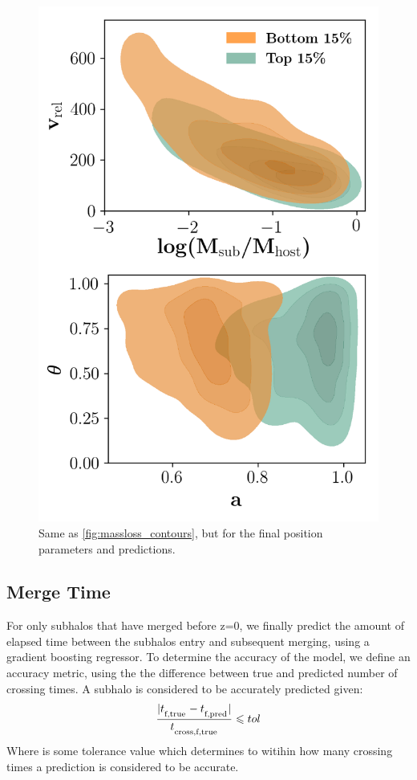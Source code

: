 \documentclass[fleqn,usenatbib]{mnras}
\begin{document}
\begin{figure}
	\includegraphics[width=\textwidth]{Figures/position_contours}
    \caption{Same as \ref{fig:massloss_contours}, but for the final position parameters and predictions.}
    \label{fig:position_contours}
\end{figure}

\subsection{Merge Time}
\label{sec:merge time}
For only subhalos that have merged before z=0, we finally predict the amount of elapsed time between the subhalos entry and subsequent merging, using a gradient boosting regressor. To determine the accuracy of the model, we define an accuracy metric, using the the difference between true and predicted number of crossing times. A subhalo is considered to be accurately predicted given:
\begin{equation}
    \label{eq:position}
    \frac{|t_\textsubscript{f,true} - t_\textsubscript{f,pred}|}{t_\textsubscript{cross,f,true}} \leq tol
\end{equation}
Where  is some tolerance value which determines to witihin how many crossing times a prediction is considered to be accurate.
\end{document}
